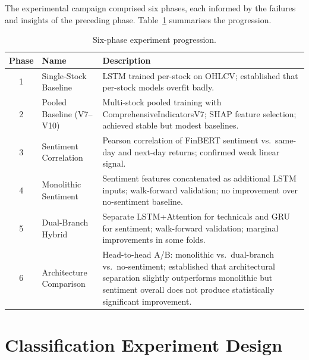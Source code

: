 The experimental campaign comprised six phases, each informed by the failures
and insights of the preceding phase.  Table~\ref{tab:experiment-phases}
summarises the progression.

\begin{table}[htbp]
\centering
\caption{Six-phase experiment progression.}
\label{tab:experiment-phases}
\begin{tabular}{@{}clp{8cm}@{}}
\toprule
\textbf{Phase} & \textbf{Name} & \textbf{Description} \\
\midrule
1 & Single-Stock Baseline   & LSTM trained per-stock on OHLCV; established
                                that per-stock models overfit badly. \\
2 & Pooled Baseline (V7--V10) & Multi-stock pooled training with
                                ComprehensiveIndicatorsV7; SHAP feature
                                selection; achieved stable but modest
                                baselines. \\
3 & Sentiment Correlation   & Pearson correlation of FinBERT sentiment vs.\
                                same-day and next-day returns; confirmed
                                weak linear signal. \\
4 & Monolithic Sentiment    & Sentiment features concatenated as additional
                                LSTM inputs; walk-forward validation; no
                                improvement over no-sentiment baseline. \\
5 & Dual-Branch Hybrid      & Separate LSTM+Attention for technicals and GRU
                                for sentiment; walk-forward validation;
                                marginal improvements in some folds. \\
6 & Architecture Comparison & Head-to-head A/B: monolithic vs.\ dual-branch
                                vs.\ no-sentiment; established that
                                architectural separation slightly outperforms
                                monolithic but sentiment overall does not
                                produce statistically significant
                                improvement. \\
\bottomrule
\end{tabular}
\end{table}

\section{Classification Experiment Design}
\label{sec:cls-experiment}

